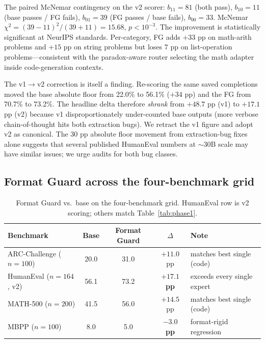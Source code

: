 \documentclass{article}
\begin{document}
The paired McNemar contingency on the v2 scorer: $b_{11}{=}81$ (both pass), $b_{10}{=}11$ (base passes / FG fails), $b_{01}{=}39$ (FG passes / base fails), $b_{00}{=}33$. McNemar $\chi^2 = (39-11)^2/(39+11) = 15.68$, $p < 10^{-3}$. The improvement is statistically significant at NeurIPS standards. Per-category, FG adds $+33$ pp on math-arith problems and $+15$ pp on string problems but loses $7$ pp on list-operation problems---consistent with the paradox-aware router selecting the math adapter inside code-generation contexts.

The v1$\rightarrow$v2 correction is itself a finding. Re-scoring the same saved completions moved the base absolute floor from 22.0\% to 56.1\% ($+34$ pp) and the FG from 70.7\% to 73.2\%. The headline delta therefore \emph{shrank} from $+48.7$ pp (v1) to $+17.1$ pp (v2) because v1 disproportionately under-counted base outputs (more verbose chain-of-thought hits both extraction bugs). We retract the v1 figure and adopt v2 as canonical. The 30 pp absolute floor movement from extraction-bug fixes alone suggests that several published HumanEval numbers at $\sim 30$B scale may have similar issues; we urge audits for both bug classes.

\subsection{Format Guard across the four-benchmark grid}
\label{sec:grid}

\begin{table}[h]
  \caption{Format Guard vs.\ base on the four-benchmark grid. HumanEval row is v2 scoring; others match Table~\ref{tab:phase1}.}
  \label{tab:fggrid}
  \centering
  \small
  \begin{tabular}{lccc l}
    \toprule
    Benchmark                  & Base & Format Guard & $\Delta$ & Note \\
    \midrule
    ARC-Challenge ($n{=}100$)  & 20.0 & 31.0 & $+11.0$ pp & matches best single (code) \\
    HumanEval ($n{=}164$, v2)  & 56.1 & 73.2 & \textbf{$+17.1$ pp} & exceeds every single expert \\
    MATH-500 ($n{=}200$)       & 41.5 & 56.0 & $+14.5$ pp & matches best single (code) \\
    MBPP ($n{=}100$)           &  8.0 &  5.0 & \textbf{$-3.0$ pp} & format-rigid regression \\
    \bottomrule
  \end{tabular}
\end{table}
\end{document}
